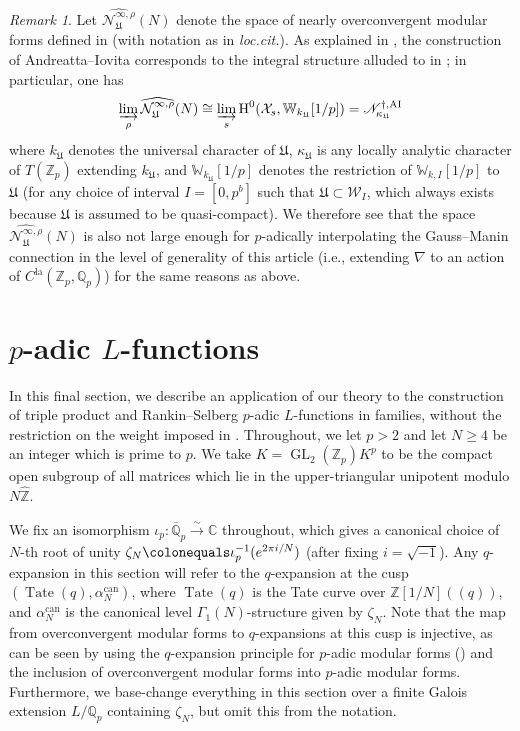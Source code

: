 \documentclass[10pt, oneside]{amsart}
\newcommand{\defeq}{\colonequals}
\numberwithin{equation}{subsection}
\theoremstyle{definition}
\theoremstyle{remark}
\newtheorem{remark}[equation]{Remark}
\newcommand{\mbb}[1]{\mathbb{#1}}
\newcommand{\opn}[1]{\operatorname{#1}}
\begin{document}
\begin{remark}
    Let $\widehat{\mathcal{N}_{\mathfrak{U}}^{\infty, \rho}}(N)$ denote the space of nearly overconvergent modular forms defined in \cite[\S 3.3.2]{Urban} (with notation as in \emph{loc.cit.}). As explained in \cite[\S B.2, p.2077]{AI_LLL}, the construction of Andreatta--Iovita corresponds to the integral structure alluded to in \cite[Remark 10]{Urban}; in particular, one has 
    \[
    \varinjlim_{\rho}\widehat{\mathcal{N}_{\mathfrak{U}}^{\infty, \rho}}(N) \cong \varinjlim_s \opn{H}^0(\mathcal{X}_s, \mbb{W}_{k_{\mathfrak{U}}}[1/p]) = \mathscr{N}^{\dagger, \opn{AI}}_{\kappa_{\mathfrak{U}}}
    \]
    where $k_{\mathfrak{U}}$ denotes the universal character of $\mathfrak{U}$, $\kappa_{\mathfrak{U}}$ is any locally analytic character of $T(\mbb{Z}_p)$ extending $k_{\mathfrak{U}}$, and $\mbb{W}_{k_{\mathfrak{U}}}[1/p]$ denotes the restriction of $\mbb{W}_{k, I}[1/p]$ to $\mathfrak{U}$ (for any choice of interval $I = [0, p^b]$ such that $\mathfrak{U} \subset \mathcal{W}_I$, which always exists because $\mathfrak{U}$ is assumed to be quasi-compact). We therefore see that the space $\widehat{\mathcal{N}_{\mathfrak{U}}^{\infty, \rho}}(N)$ is also not large enough for $p$-adically interpolating the Gauss--Manin connection in the level of generality of this article (i.e., extending $\nabla$ to an action of $C^{\opn{la}}(\mbb{Z}_p, \mbb{Q}_p)$) for the same reasons as above.
\end{remark}



\section{\texorpdfstring{$p$}{p}-adic \texorpdfstring{$L$}{L}-functions} \label{SectpadicLfunctions}

In this final section, we describe an application of our theory to the construction of triple product and Rankin--Selberg $p$-adic $L$-functions in families, without the restriction on the weight imposed in \cite{AI_LLL}. Throughout, we let $p > 2$ and let $N \geq 4$ be an integer which is prime to $p$. We take $K = \opn{GL}_2(\mbb{Z}_p) K^p$ to be the compact open subgroup of all matrices which lie in the upper-triangular unipotent modulo $N \widehat{\mbb{Z}}$.

We fix an isomorphism $\iota_p \colon {\overline{\mathbb{Q}}_p} \xrightarrow{\sim} \mbb{C}$ throughout, which gives a canonical choice of $N$-th root of unity $\zeta_N \defeq \iota_p^{-1}(e^{2\pi i/N})$ (after fixing $i = \sqrt{-1}$). Any $q$-expansion in this section will refer to the $q$-expansion at the cusp $(\opn{Tate}(q), \alpha_N^{\opn{can}})$, where $\opn{Tate}(q)$ is the Tate curve over $\mbb{Z}[1/N](\!(q)\!)$, and $\alpha_{N}^{\opn{can}}$ is the canonical level $\Gamma_1(N)$-structure given by $\zeta_N$. Note that the map from overconvergent modular forms to $q$-expansions at this cusp is injective, as can be seen by using the $q$-expansion principle for $p$-adic modular forms (\cite{Katz}) and the inclusion of overconvergent modular forms into $p$-adic modular forms. Furthermore, we base-change everything in this section over a finite Galois extension $L / \mbb{Q}_p$ containing $\zeta_N$, but omit this from the notation.
\end{document}
